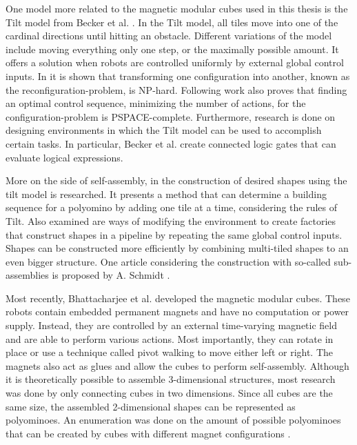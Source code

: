 One model more related to the magnetic modular cubes used in this thesis is the Tilt model from Becker et al. \cite{Becker2014_SP}.
In the Tilt model, all tiles move into one of the cardinal directions until hitting an obstacle.
Different variations of the model include moving everything only one step, or the maximally possible amount.
It offers a solution when robots are controlled uniformly by external global control inputs.
In \cite{Becker2014_SP} it is shown that transforming one configuration into another, known as the reconfiguration-problem, is NP-hard.
Following work \cite{Becker2014} also proves that finding an optimal control sequence, minimizing the number of actions, for the configuration-problem is PSPACE-complete.
Furthermore, research is done on designing environments in which the Tilt model can be used to accomplish certain tasks.
In particular, Becker et al. \cite{Becker2014} create connected logic gates that can evaluate logical expressions.

More on the side of self-assembly, in \cite{Becker2020} the construction of desired shapes using the tilt model is researched.
It presents a method that can determine a building sequence for a polyomino by adding one tile at a time, considering the rules of Tilt.
Also examined are ways of modifying the environment to create factories that construct shapes in a pipeline by repeating the same global control inputs.
Shapes can be constructed more efficiently by combining multi-tiled shapes to an even bigger structure.
One article considering the construction with so-called sub-assemblies is proposed by A. Schmidt \cite{Schmidt2018}.

Most recently, Bhattacharjee et al. \cite{Bhattacharjee2022} developed the magnetic modular cubes.
These robots contain embedded permanent magnets and have no computation or power supply.
Instead, they are controlled by an external time-varying magnetic field and are able to perform various actions.
Most importantly, they can rotate in place or use a technique called pivot walking to move either left or right.
The magnets also act as glues and allow the cubes to perform self-assembly.
Although it is theoretically possible to assemble 3-dimensional structures, most research was done by only connecting cubes in two dimensions.
Since all cubes are the same size, the assembled 2-dimensional shapes can be represented as polyominoes.
An enumeration was done on the amount of possible polyominoes that can be created by cubes with different magnet configurations \cite{Lu2021}.


